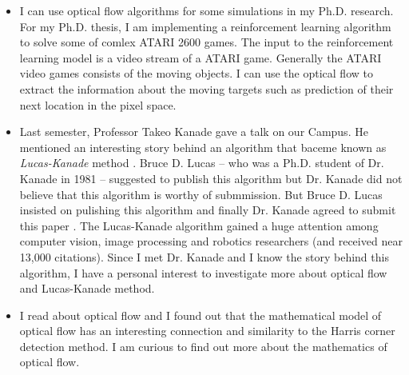 \documentclass[11pt]{article}
\theoremstyle{plain}
\theoremstyle{definition}
\begin{document}
\begin{itemize}

\item I can use optical flow algorithms for some simulations in my Ph.D. research. For my Ph.D. thesis, I am implementing a reinforcement learning algorithm to solve some of comlex ATARI 2600 games. The input to the reinforcement learning model is a video stream of a ATARI game. Generally the ATARI video games consists of the moving objects. I can use the optical flow to extract the information about the moving targets such as prediction of their next location in the pixel space.    

\item Last semester, Professor Takeo Kanade gave a talk on our Campus. He mentioned an interesting story behind an algorithm that baceme known as \emph{Lucas-Kanade} method \citep{Lucas:Kanade:1981}. Bruce D. Lucas -- who was a Ph.D. student of Dr. Kanade in 1981 -- suggested to publish this algorithm but Dr. Kanade did not believe that this algorithm is worthy of submmission. But Bruce D. Lucas insisted on pulishing this algorithm and finally Dr. Kanade agreed to submit this paper \citep{Lucas:Kanade:1981}. The Lucas-Kanade algorithm \citep{Lucas:Kanade:1981} gained a huge attention among computer vision, image processing and robotics researchers (and received near 13,000 citations). Since I met Dr. Kanade and I know the story behind this algorithm, I have a personal interest to investigate more about optical flow and Lucas-Kanade method.    

\item I read about optical flow and I found out that the mathematical model of optical flow has an interesting connection and similarity to the Harris corner detection method. I am curious to find out more about the mathematics of optical flow. 

\end{itemize} 




\end{document}
